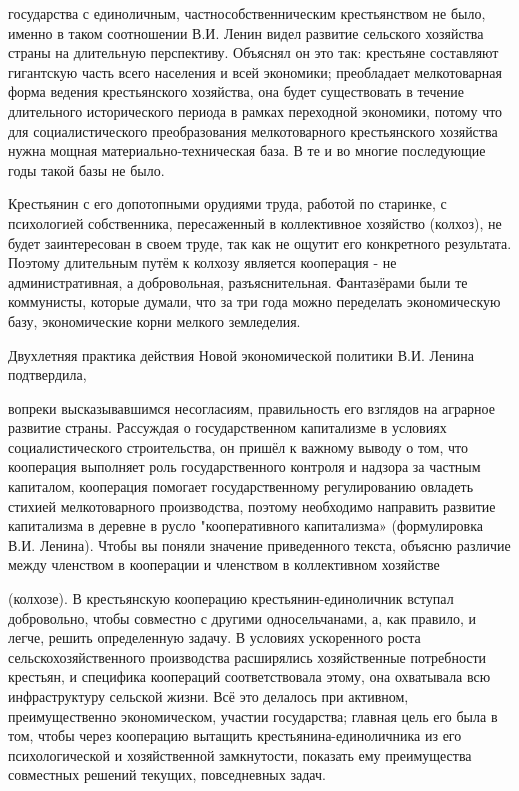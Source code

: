 \label{096-1}
государства с единоличным, частнособственническим крестьянством не было, именно в таком соотношении В.И. Ленин видел развитие сельского хозяйства страны на длительную перспективу. Объяснял он это так: крестьяне составляют гигантскую часть всего населения и всей экономики; преобладает мелкотоварная форма ведения крестьянского хозяйства, она будет существовать в течение длительного исторического периода в рамках переходной экономики, потому что для социалистического преобразования мелкотоварного крестьянского хозяйства нужна мощная материально-техническая база. В те и во многие последующие годы такой базы не было.

\label{097-1}
Крестьянин с его допотопными орудиями труда, работой по старинке, с психологией собственника, пересаженный в коллективное хозяйство (колхоз), не будет заинтересован в своем труде, так как не ощутит его конкретного результата. Поэтому длительным путём к колхозу является кооперация - не административная, а добровольная, разъяснительная. Фантазёрами были те коммунисты, которые думали, что за три года можно переделать экономическую базу, экономические корни мелкого земледелия.

Двухлетняя практика действия Новой экономической политики В.И. Ленина подтвердила, 

\label{098-1}
вопреки высказывавшимся несогласиям, правильность его взглядов на аграрное развитие страны. Рассуждая о государственном капитализме в условиях социалистического строительства, он пришёл к важному выводу о том, что кооперация выполняет роль государственного контроля и надзора за частным капиталом, кооперация помогает государственному регулированию овладеть стихией мелкотоварного производства, поэтому необходимо направить развитие капитализма в деревне в русло "кооперативного капитализма» (формулировка В.И. Ленина). Чтобы вы поняли значение приведенного текста, объясню различие между членством в кооперации и членством в коллективном хозяйстве

\label{099-1}
(колхозе). В крестьянскую кооперацию крестьянин-единоличник вступал добровольно, чтобы совместно с другими односельчанами, а, как правило, и легче, решить определенную задачу. В условиях ускоренного роста сельскохозяйственного производства расширялись хозяйственные потребности крестьян, и специфика коопераций соответствовала этому, она охватывала всю инфраструктуру сельской жизни. Всё это делалось при активном, преимущественно экономическом, участии государства; главная цель его была в том, чтобы через кооперацию вытащить крестьянина-единоличника из его психологической и хозяйственной замкнутости, показать ему преимущества совместных решений текущих, повседневных задач.

